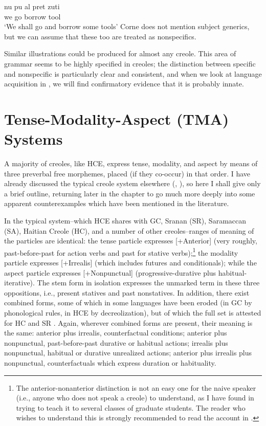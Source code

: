 \ea\label{ex:2:26}
 \gll nu pu al pret zuti\\
we {\IRR} go borrow tool \\
\glt `We shall go and borrow some tools'
\z
Corne does not mention subject generics, but we can assume that these too are treated as nonspecifics.

Similar illustrations could be produced for almost any creole. This area of grammar seems to be highly specified in creoles; the dis\-tinction between specific and nonspecific is particularly clear and consistent, and when we look at language acquisition in , we will find confirmatory evidence that it is probably innate.

\section{Tense-Modality-Aspect (TMA) Systems}

A majority of creoles, like HCE, express tense, modality, and aspect by means of three preverbal free morphemes, placed (if they co-occur) in that order. I have already discussed the typical creole system elsewhere (\citealt{Bickerton1974}, \citeyear[Chapter 2]{Bickerton1975}), so here I shall give only a brief outline, returning later in the chapter to go much more deeply into some apparent counterexamples which have been men\-tioned in the literature.

In the typical system--which HCE shares with GC, Sranan (SR), Saramaccan (SA), Haitian Creole (HC), and a number of other creoles--ranges of meaning of the particles are identical: the tense particle ex\-presses [+Anterior] (very roughly, past-before-past for action verbs and past for stative verbs);\footnote{The anterior-nonanterior distinction is not an easy one for the naive speaker (i.e., anyone who does not speak a creole) to under\-stand, as I have found in trying to teach it to several classes of graduate students. The reader who wishes to understand this is strongly recom\-mended to read the account in \citet[Chapter 2]{Bickerton1975}.} the modality particle expresses [+Irrealis] (which includes futures and conditionals); while the aspect particle expresses [+Nonpunctual] (progressive-durative plus habitual-iterative). The stem form in isolation expresses the unmarked term in these three oppositions, i.e., present statives and past nonstatives. In addition, there exist combined forms, some of which in some languages have been eroded (in GC by phonological rules, in HCE by decreolization), but of which the full set is attested for HC \citep{Hall1953} and SR \citep{Voorhoeve1957}. Again, wherever combined forms are present, their meaning is the same: anterior plus irrealis, counterfactual conditions; anterior plus nonpunctual, past-before-past durative or habitual actions; irrealis plus nonpunctual, habitual or durative unrealized actions; anterior plus irrealis plus nonpunctual, counterfactuals which express duration or habituality.

